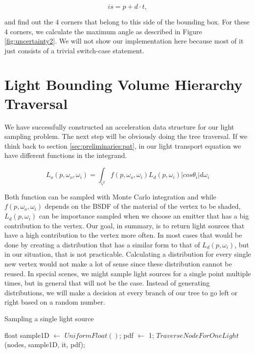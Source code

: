 \begin{equation}
is = p + d \cdot t,
\end{equation}

and find out the 4 corners that belong to this side of the bounding box. For these 4 corners, we calculate the maximum angle as described in Figure \ref{fig:uncertainty2}. We will not show our implementation here because most of it just consists of a trivial switch-case statement.

\section{Light Bounding Volume Hierarchy Traversal}
\label{sec:alg:tra}

We have successfully constructed an acceleration data structure for our light sampling problem. The next step will be obviously doing the tree traversal. If we think back to section \ref{sec:preliminaries:pat}, in our light transport equation we have different functions in the integrand. 

\begin{equation}
L_o(p, \omega_o, \omega_i) = \int_{\varsigma^2}f(p, \omega_o, \omega_i)L_d(p, \omega_i)|cos\theta_i|d\omega_i
\end{equation}

Both function can be sampled with Monte Carlo integration and while $f(p, \omega_o, \omega_i)$ depends on the BSDF of the material of the vertex to be shaded, $L_d(p, \omega_i)$ can be importance sampled when we choose an emitter that has a big contribution to the vertex. Our goal, in summary, is to return light sources that have a high contribution to the vertex more often. In most cases that would be done by creating a distribution that has a similar form to that of $L_d(p, \omega_i)$, but in our situation, that is not practicable. Calculating a distribution for every single new vertex would not make a lot of sense since these distribution cannot be reused. In special scenes, we might sample light sources for a single point multiple times, but in general that will not be the case. Instead of generating distributions, we will make a decision at every branch of our tree to go left or right based on a random number.


\begin{algorithm}
	\caption{Sampling a single light source}
	\label{alg:sample1}
	\begin{algorithmic}[1] %
			\State float sample1D $\gets$ $UniformFloat()$;
			\State *pdf $\gets$ 1;
			\State \Return $TraverseNodeForOneLight$(nodes, sample1D, it, pdf);
			\EndProcedure
		\end{algorithmic}
	\end{algorithm}
	
